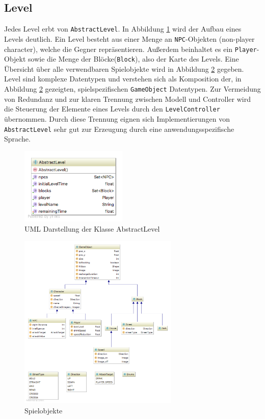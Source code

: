 \subsection{Level}
\label{sub:architektur:level}

Jedes Level erbt von \texttt{AbstractLevel}.
In Abbildung \ref{fig:spielarchitektur:abstractlevel} wird der Aufbau eines Levels deutlich.
Ein Level besteht aus einer Menge an \texttt{NPC}-Objekten (non-player character), welche die Gegner repräsentieren.
Außerdem beinhaltet es ein \texttt{Player}-Objekt sowie die Menge der Blöcke(\texttt{Block}), also der Karte des Levels.
Eine Übersicht über alle verwendbaren Spielobjekte wird in Abbildung \ref{fig:spielarchitektur:model} gegeben.
Level sind komplexe Datentypen und verstehen sich als Komposition der, in Abbildung \ref{fig:spielarchitektur:model} gezeigten, spielspezifischen \texttt{GameObject} Datentypen.
Zur Vermeidung von Redundanz und zur klaren Trennung zwischen Modell und Controller wird die Steuerung der Elemente eines Levels durch den \texttt{LevelController} übernommen.
Durch diese Trennung eignen sich Implementierungen von \texttt{AbstractLevel} sehr gut zur Erzeugung durch eine anwendungsspezifische Sprache.

\begin{figure}[]
\centering
\includegraphics[width=2in]{img/05_abstractlevel_uml.png}
\caption{UML Darstellung der Klasse AbstractLevel}
\label{fig:spielarchitektur:abstractlevel}
\end{figure}

\begin{figure}[]
\centering
\includegraphics[width=3in]{img/05_model.png}
\caption{Spielobjekte}
\label{fig:spielarchitektur:model}
\end{figure}

